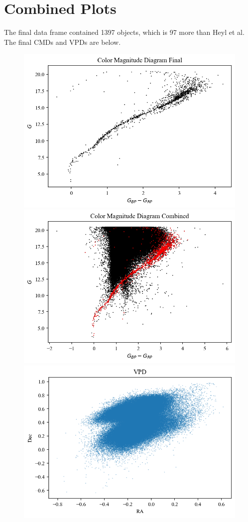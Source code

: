 \documentclass{article}
\begin{document}
\section{Combined Plots}

The final data frame contained 1397 objects, which is 97 more than Heyl et al.
The final CMDs and VPDs are below.

\begin{figure}
    [H]
    \centering
    \includegraphics[scale = .5]{Figure 2025-02-08 230950 (6).png}
    \includegraphics[scale = .5]{Figure 2025-02-08 230950 (7).png}
    \includegraphics[scale = .5]{Figure 2025-02-08 230950 (8).png}

\end{figure}
\end{document}
